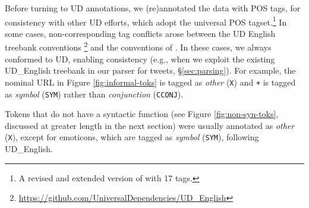 \documentclass[11pt,a4paper]{article}
\newcommand{\heart}{\ensuremath\heartsuit}
\newcommand{\yjcomment}[1]{\textcolor{orange}{[$_\mathrm{L}^\mathrm{Y}$#1]}}
\newcommand{\yicomment}[1]{\textcolor{gray}{[#1 ---\textsc{yi}]}}
\begin{document}
Before turning to UD annotations, we (re)annotated the data with 
POS tags, for consistency with other UD efforts,
which adopt the universal POS tagset.\footnote{A revised and extended version of \citet{PETROV12.274} with 17 tags.}
In some cases,  non-corresponding tag conflicts arose between the UD English 
treebank conventions \cite[UD\_English;][]{Marneffe2014UniversalSD}\footnote{\url{https://github.com/UniversalDependencies/UD_English}}
and the conventions of .  %
In these cases, we always
conformed to UD, enabling consistency (e.g., when we exploit the
existing UD\_English treebank in our parser for tweets, \S\ref{sec:parsing}).  For example,  
the nominal URL in Figure \ref{fig:informal-toks} is tagged as {\it
  other} ({\tt X}) and {\tt +} is tagged as {\it symbol} ({\tt SYM})
rather than {\it conjunction} ({\tt CCONJ}).  

Tokens that do not have a syntactic function (see Figure \ref{fig:non-syn-toks}, discussed at greater
length in the next section) were usually annotated as \emph{other}
(\texttt{X}), except for emoticons, which are tagged as \emph{symbol}
(\texttt{SYM}), following UD\_English.
\end{document}
